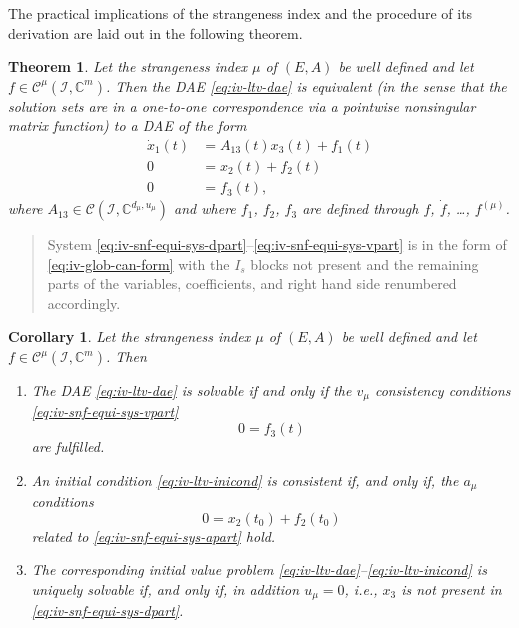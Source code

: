 \documentclass[]{book}
\newenvironment {JHSAYS} [0] {\begin{quote}\color{jhsc}} {\end{quote}}
\newtheorem{theorem}{Theorem}[chapter]
\newtheorem{corollary}{Corollary}[chapter]
\theoremstyle{definition}
\theoremstyle{definition}
\theoremstyle{definition}
\theoremstyle{definition}
\theoremstyle{remark}
\begin{document}
The practical implications of the strangeness index and the procedure of its derivation are laid out in the following theorem.

\begin{theorem}
\protect\hypertarget{thm:iv-strangeness-free-equiv-system}{}{\label{thm:iv-strangeness-free-equiv-system} }Let the strangeness index \(\mu\) of \((E, A)\) be well defined and let \(f\in \mathcal C^\mu(\mathcal I, \mathbb C^{m})\).
Then the DAE \eqref{eq:iv-ltv-dae} is equivalent (in the sense that the solution sets are in a one-to-one correspondence via a pointwise nonsingular matrix function) to a DAE of the form
\begin{align}
\dot x_1(t) &= A_{13}(t)x_3(t) + f_1(t) \label{eq:iv-snf-equi-sys-dpart}\\
0 &= x_2(t) + f_2(t) \label{eq:iv-snf-equi-sys-apart}\\
0 &= f_3(t), \label{eq:iv-snf-equi-sys-vpart}
\end{align}
where \(A_{13} \in \mathcal C(\mathcal I, \mathbb C^{d_\mu, u_\mu})\) and where \(f_1\), \(f_2\), \(f_3\) are defined through \(f\), \(\dot f\), \dots, \(f^{(\mu)}\).
\end{theorem}

\begin{JHSAYS}
System \eqref{eq:iv-snf-equi-sys-dpart}--\eqref{eq:iv-snf-equi-sys-vpart} is in the form of \eqref{eq:iv-glob-can-form} with the \(I_s\) blocks not present and the remaining parts of the variables, coefficients, and right hand side renumbered accordingly.
\end{JHSAYS}

\begin{corollary}
\protect\hypertarget{cor:iv-snf-solvability}{}{\label{cor:iv-snf-solvability} }Let the strangeness index \(\mu\) of \((E, A)\) be well defined and let \(f\in \mathcal C^\mu(\mathcal I, \mathbb C^{m})\). Then

\begin{enumerate}
\def\labelenumi{\arabic{enumi}.}
\item
  The DAE \eqref{eq:iv-ltv-dae} is solvable if and only if the \(v_\mu\) consistency conditions \eqref{eq:iv-snf-equi-sys-vpart}
  \[
    0=f_3(t)
  \]
  are fulfilled.
\item
  An initial condition \eqref{eq:iv-ltv-inicond} is consistent if, and only if, the \(a_\mu\) conditions
  \[
  0=x_2(t_0) + f_2(t_0)
  \]
  related to \eqref{eq:iv-snf-equi-sys-apart} hold.
\item
  The corresponding initial value problem \eqref{eq:iv-ltv-dae}--\eqref{eq:iv-ltv-inicond} is uniquely solvable if, and only if, in addition \(u_\mu=0\), i.e., \(x_3\) is not present in \eqref{eq:iv-snf-equi-sys-dpart}.
\end{enumerate}
\end{corollary}
\end{document}
